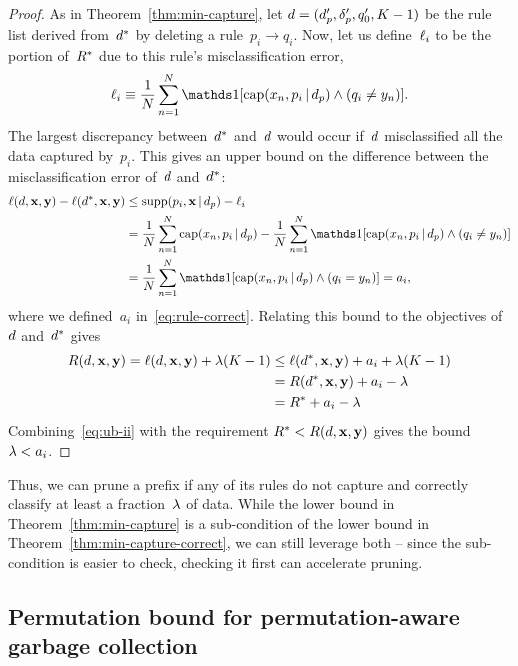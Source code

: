 \begin{proof}
As in Theorem~\ref{thm:min-capture},
let ${{d} =  (d_p', \delta_p', q_0', K-1)}$ be the rule list
derived from~$d^*$ by deleting a rule~${p_i \rightarrow q_i}$.
%
Now, let us define~$\ell_i$ to be the portion of~$R^*$
due to this rule's misclassification error,
\begin{align}
\Loss_i \equiv \frac{1}{N} \sum_{n=1}^N
  \one [ \Cap(x_n, p_i \given \Prefix) \wedge (q_i \neq y_n) ].
\end{align}
The largest discrepancy between~$d^*$ and~${d}$ would
occur if~${d}$ misclassified all the data captured by~$p_i$.
%
This gives an upper bound on the difference between
the misclassification error of~${d}$ and~$d^*$:
\begin{align}
\Loss(\RL, \x, \y) - \Loss(\OptimalRL, \x, \y)
&\le \Supp(p_i, \x \given \Prefix) - \Loss_i \nn \\
&= \frac{1}{N} \sum_{n=1}^N \Cap(x_n, p_i \given \Prefix)
  - \frac{1}{N} \sum_{n=1}^N
  \one [ \Cap(x_n, p_i \given \Prefix) \wedge (q_i \neq y_n) ] \nn \\
&= \frac{1}{N} \sum_{n=1}^N
  \one [ \Cap(x_n, p_i \given \Prefix) \wedge (q_i = y_n) ] = a_i,
\end{align}
where we defined~$a_i$ in~\eqref{eq:rule-correct}.
%
Relating this bound to the objectives of~${d}$ and~$d^*$ gives
\begin{align}
\Obj(\RL, \x, \y) = \Loss(\RL, \x, \y) + \Reg (K - 1)
&\le \Loss(\OptimalRL, \x, \y) + a_i + \Reg(K - 1) \nn \\
&= \Obj(\OptimalRL, \x, \y) + a_i - \Reg \nn \\
&= \OptimalObj + a_i - \Reg
\label{eq:ub-ii}
\end{align}
Combining~\eqref{eq:ub-ii} with the requirement
${R^* < R({d}, \mathbf{x}, \mathbf{y})}$ gives the bound~${{\lambda} < a_i}$.
\end{proof}

Thus, we can prune a prefix if any of its rules do not capture
and correctly classify at least a fraction~${\lambda}$ of data.
%
While the lower bound in Theorem~\ref{thm:min-capture} is a sub-condition
of the lower bound in Theorem~\ref{thm:min-capture-correct},
we can still leverage both -- since the sub-condition is easier to check,
checking it first can accelerate pruning.

\subsection{Permutation bound for permutation-aware garbage collection}
\label{sec:permutation}


